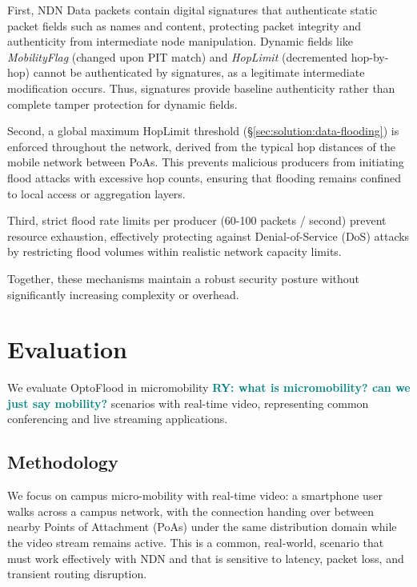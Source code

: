 \documentclass[10pt,conference]{IEEEtran}
\newcommand{\ryo}[1]{\textbf{\textcolor{teal}{RY: #1}}}
\begin{document}
First, NDN Data packets contain digital signatures that authenticate static packet fields such as names and content, protecting packet integrity and authenticity from intermediate node manipulation. Dynamic fields like \textit{MobilityFlag} (changed upon PIT match) and \textit{HopLimit} (decremented hop-by-hop) cannot be authenticated by signatures, as a legitimate intermediate modification occurs. Thus, signatures provide baseline authenticity rather than complete tamper protection for dynamic fields.

Second, a global maximum HopLimit threshold (\S\ref{sec:solution:data-flooding}) is enforced throughout the network, derived from the typical hop distances of the mobile network between PoAs. This prevents malicious producers from initiating flood attacks with excessive hop counts, ensuring that flooding remains confined to local access or aggregation layers.

Third, strict flood rate limits per producer (60-100 packets / second) prevent resource exhaustion, effectively protecting against Denial-of-Service (DoS) attacks by restricting flood volumes within realistic network capacity limits.

Together, these mechanisms maintain a robust security posture without significantly increasing complexity or overhead.

\section{Evaluation}
\label{sec:evaluation}

We evaluate OptoFlood in micromobility \ryo{what is micromobility? can we just say mobility?} scenarios with real-time video, representing common conferencing and live streaming applications.

\subsection{Methodology}

We focus on campus micro-mobility with real-time video: a smartphone user walks across a campus network, with the connection handing over between nearby Points of Attachment (PoAs) under the same distribution domain while the video stream remains active. This is a common, real-world, scenario that must work effectively with NDN and that is sensitive to latency, packet loss, and transient routing disruption.
\end{document}
